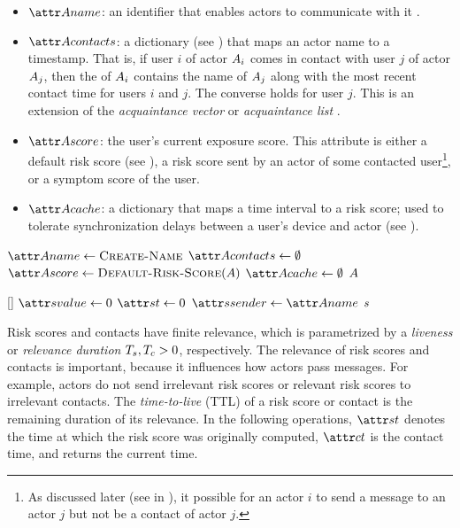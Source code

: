 %
\begin{itemize}
	\item $\aActorName$: an identifier that enables actors to communicate with it \cite{Hewitt1977, AghaThesis1985}.
	\item $\aActorContacts$: a dictionary (see ) that maps an actor name to a timestamp. That is, if user $i$ of actor $A_i$ comes in contact with user $j$ of actor $A_j$, then the \emph{\nContactsAttr} of $A_i$ contains the name of $A_j$ along with the most recent contact time for users $i$ and $j$. The converse holds for user $j$. This is an extension of the \emph{acquaintance vector} \cite{Hewitt1977} or \emph{acquaintance list} \cite{AghaThesis1985, Agha1985}.
	\item $\aActorScore$: the user's current exposure score. This attribute is either a default risk score (see \cDefaultScore), a risk score sent by an actor of some contacted user\footnote{As discussed later (see \cHandleContactMessage{} in ), it possible for an actor $i$ to send a message to an actor $j$ but not be a contact of actor $j$.}, or a symptom score of the user.
	\item $\aActorCache$: a dictionary that maps a time interval to a risk score; used to tolerate synchronization delays between a user's device and actor (see ).
\end{itemize}
%
\begin{function}{\nCreateActor}
    \State $\aActorName \assign \cCreateName$
    \State $\aActorContacts \assign \emptyset$
    \State $\aActorScore \assign \cDefaultScore[\vActor]$
    \State $\aActorCache \assign \emptyset$
    \State \Return $A$
\end{function}
\begin{function}{\nDefaultScore}[\vActor]
    \State $\aScoreValue \assign 0$
    \State $\aScoreTime \assign 0$
    \State $\aScoreSender \assign \aActorName$
    \State \Return $s$
\end{function}
%
Risk scores and contacts have finite relevance, which is parametrized by a \emph{liveness} or \emph{relevance duration} $T_s, T_c > 0$, respectively. The relevance of risk scores and contacts is important, because it influences how actors pass messages. For example, actors do not send irrelevant risk scores or relevant risk scores to irrelevant contacts. The \emph{time-to-live} (TTL) of a risk score or contact is the remaining duration of its relevance. In the following operations, $\aScoreTime$ denotes the time at which the risk score was originally computed, $\aContactTime$ is the contact time, and \cGetTime{} returns the current time.
